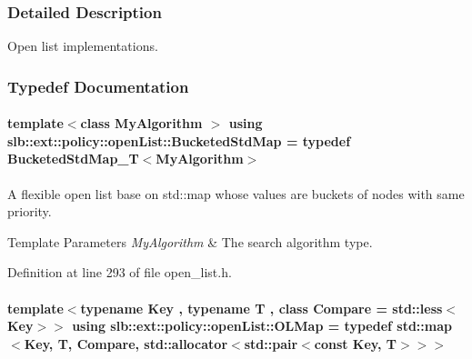 \subsubsection{Detailed Description}
Open list implementations. 

\subsubsection{Typedef Documentation}
\paragraph[{\texorpdfstring{Bucketed\+Std\+Map}{BucketedStdMap}}]{\setlength{\rightskip}{0pt plus 5cm}template$<$class My\+Algorithm $>$ using {\bf slb\+::ext\+::policy\+::open\+List\+::\+Bucketed\+Std\+Map} = typedef {\bf Bucketed\+Std\+Map\+\_\+T}$<$My\+Algorithm$>$}\hypertarget{namespaceslb_1_1ext_1_1policy_1_1openList_af51e9574befd1fada8e2695f7acb83b8}{}\label{namespaceslb_1_1ext_1_1policy_1_1openList_af51e9574befd1fada8e2695f7acb83b8}


A flexible open list base on {\ttfamily std\+::map} whose values are buckets of nodes with same priority. 


\begin{DoxyTemplParams}{Template Parameters}
{\em My\+Algorithm} & The search algorithm type. \\
\hline
\end{DoxyTemplParams}


Definition at line 293 of file open\+\_\+list.\+h.

\paragraph[{\texorpdfstring{O\+L\+Map}{OLMap}}]{\setlength{\rightskip}{0pt plus 5cm}template$<$typename Key , typename T , class Compare  = std\+::less$<$\+Key$>$$>$ using {\bf slb\+::ext\+::policy\+::open\+List\+::\+O\+L\+Map} = typedef std\+::map$<$Key, T, Compare, std\+::allocator$<$std\+::pair$<$const Key, T$>$$>$$>$}\hypertarget{namespaceslb_1_1ext_1_1policy_1_1openList_ae328455bada2886ad728a9f54bfa1f6a}{}\label{namespaceslb_1_1ext_1_1policy_1_1openList_ae328455bada2886ad728a9f54bfa1f6a}


